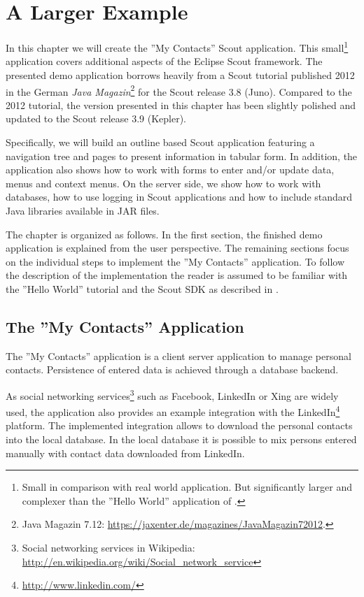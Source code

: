 \documentclass[a4paper,10pt,twoside]{book}
\begin{document}
  \sloppy
\fi

\chapter{A Larger Example}

In this chapter we will create the ''My Contacts'' Scout application.
This small\footnote{
Small in comparison with real world application. But significantly larger and complexer than the ''Hello World'' application of .
} application covers additional aspects of the Eclipse Scout framework. 
The presented demo application borrows heavily from a Scout tutorial published 2012 in the German \textit{Java Magazin}\footnote{
Java Magazin 7.12: \url{https://jaxenter.de/magazines/JavaMagazin72012}.
} 
for the Scout release 3.8 (Juno).
Compared to the 2012 tutorial, the version presented in this chapter has been slightly polished and updated to the Scout release 3.9 (Kepler).

Specifically, we will build an outline based Scout application featuring a navigation tree and pages to present information in tabular form. 
In addition, the application also shows how to work with forms to enter and/or update data, menus and context menus. 
On the server side, we show how to work with databases, how to use logging in Scout applications and how to include standard Java libraries available in JAR files. 

The chapter is organized as follows.
In the first section, the finished demo application is explained from the user perspective. 
The remaining sections focus on the individual steps to implement the ''My Contacts'' application. 
To follow the description of the implementation the reader is assumed to be familiar with the ''Hello World'' tutorial and the Scout SDK as described in . 

\section{The ''My Contacts'' Application}

The ''My Contacts'' application is a client server application to manage personal contacts. 
Persistence of entered data is achieved through a database backend. 

As social networking services\footnote{
Social networking services in Wikipedia: \url{http://en.wikipedia.org/wiki/Social_network_service}
} 
such as Facebook, LinkedIn or Xing are widely used, the application also provides an example integration with the LinkedIn\footnote{
\url{http://www.linkedin.com/}
} 
platform. 
The implemented integration allows to download the personal contacts into the local database. 
In the local database it is possible to mix persons entered manually with contact data downloaded from LinkedIn. 
\end{document}
